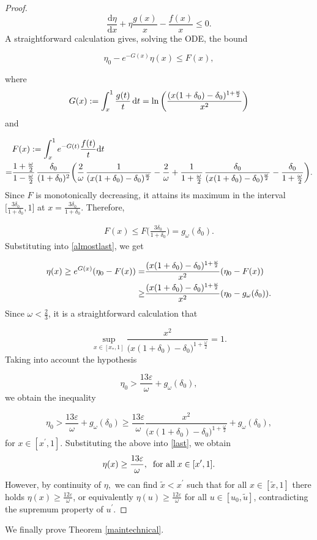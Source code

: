 \documentclass{article}[11pt]
\newcommand{\hsp}{\hspace{.5mm}}
\newcommand{\be}{\begin{equation}}
\newcommand{\ee}{\end{equation}}
\numberwithin{equation}{section}
\begin{document}
\begin{proof}
\[ \frac{\text{d}\eta}{\text{d}x}+\eta \frac{g(x)}{x}-\frac{f(x)}{x}\leq 0.    \]A straightforward calculation gives, solving the ODE, the bound

\be \eta_0 - e^{-G(x)}\eta(x)\leq F(x), \label{almostlast}\ee

where \be G(x) := \int_x^1 \frac{g(t)}{t} \hsp \text{d}t= \ln \bigg(\frac{(x(1+\delta_0)-\delta_0)^{1+\frac{\omega}{2}}}{x^2}\bigg)\ee and

\begin{align}
&F(x) := \int_x^1 e^{-G(t)}\frac{f(t)}{t} \text{d}t \notag \\ =& \frac{1+\frac{\omega}{2}}{1-\frac{\omega}{2}} \hsp \frac{\delta_0}{(1+\delta_0)^2}\bigg(\frac{2}{\omega}\hsp \frac{1}{(x(1+\delta_0)-\delta_0)^{\frac{\omega}{2}}}-\frac{2}{\omega}+\frac{1}{1+\frac{\omega}{2}}\hsp\frac{\delta_0}{(x(1+\delta_0)-\delta_0)^{\frac{\omega}{2}}}- \frac{\delta_0}{1+\frac{\omega}{2}}\bigg). 
\end{align}Since $F$ is monotonically decreasing, it attains its maximum in the interval $\big[ \frac{3\delta_0}{1+\delta_0},1\big]$ at $x= \frac{3 \delta_0}{1+\delta_0}$. Therefore, 

\begin{align}
F(x)\leq F\big(\frac{3\delta_0}{1+\delta_0}\big)= g_{\omega}(\delta_0).
\end{align}Substituting into \eqref{almostlast}, we get

\begin{align} \label{last}\notag \eta(x)\geq e^{G(x)}(\eta_0-F(x))=& \frac{(x(1+\delta_0)-\delta_0)^{1+\frac{\omega}{2}}}{x^2}(\eta_0-F(x)) \\ \geq& \frac{(x(1+\delta_0)-\delta_0)^{1+\frac{\omega}{2}}}{x^2}(\eta_0-g_{\omega}(\delta_0)). \end{align}Since $\omega<\frac{2}{3}$, it is a straightforward calculation that 

\[  \sup_{x \in[x_*,1]} \frac{x^2}{\big(x(1+\delta_0)-\delta_0\big)^{1+\frac{\omega}{2}}}=1.   \]Taking into account the hypothesis 

\[ \eta_0 > \frac{13 \varepsilon}{\omega}+g_{\omega}(\delta_0),   \]we obtain the inequality

\[  \eta_0 > \frac{13\varepsilon}{\omega}+g_{\omega}(\delta_0) \geq \frac{13 \varepsilon}{\omega}  \frac{x^2}{\big(x(1+\delta_0)-\delta_0\big)^{1+\frac{\omega}{2}}} +g_{\omega}(\delta_0), \]for $x\in[x^{\prime},1]$. Substituting the above into \eqref{last}, we obtain \[ \eta(x) \geq \frac{13\varepsilon}{\omega}, \hspace{2mm} \text{for all} \hspace{1mm} x\in[x^{\prime},1].    \]However, by continuity of $\eta,$ we can find $\tilde{x}<x^{\prime}$ such that for all $x \in[\tilde{x},1]$ there holds $\eta(x)\geq \frac{12\varepsilon}{\omega}$, or equivalently $\eta(u)\geq \frac{12\varepsilon}{\omega}$ for all $u \in [u_0,\tilde{u}]$, contradicting the supremum property of $u^{\prime}$.
\end{proof}
\noindent We finally prove Theorem \ref{maintechnical}.
\end{document}
